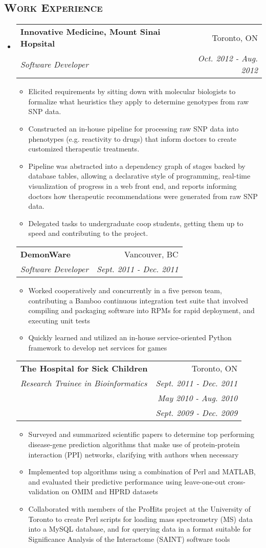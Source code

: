 \documentclass[letterpaper,11pt]{article}
\makeatletter
\newcommand{\company}[1]{
    \textbf{#1}
}
\newcommand{\heading}[1]{
    \textsc{\textbf{#1}}
}
\newcommand*\resheading[1]{\subsection*{\heading{#1}}\vspace{0.3em}\nopagebreak[4]}
\newcommand{\resitem}[1]{\item #1 \vspace{-2pt}}
\newcommand{\ressubheading}[4]{
\begin{tabular*}{6.5in}{l@{\extracolsep{\fill}}r}
    
		\company{#1} & #2 \\
		\textit{#3} & \textit{#4} \\
\end{tabular*}\vspace{-6pt}}
\newcommand{\sickkids}[6]{
\begin{tabular*}{6.5in}{l@{\extracolsep{\fill}}r}
		\company{#1} & #2 \\
		\textit{#3} & \textit{#4} \\
		 & \textit{#5} \\
		 & \textit{#6} \\
\end{tabular*}\vspace{-6pt}}
\makeatother
\begin{document}
\resheading{Work Experience}
\begin{itemize}
\item

	\ressubheading{Innovative Medicine, Mount Sinai Hopsital}{Toronto, ON}{Software Developer}{Oct. 2012 - Aug. 2012}
	\begin{itemize}
		\resitem{
            Elicited requirements by sitting down with molecular biologists to formalize 
            what heuristics they apply to determine genotypes from raw SNP data.
        }
		\resitem{
            Constructed an in-house pipeline for processing raw SNP data into phenotypes 
            (e.g. reactivity to drugs) that inform doctors to create customized therapeutic 
            treatments.  
        }
        \resitem{
            Pipeline was abstracted into a dependency graph of stages backed by database 
            tables, allowing a declarative style of programming,  real-time 
            visualization of progress in a web front end, and reports informing 
            doctors how therapeutic recommendations were generated from raw SNP data.
        }
        \resitem{
            Delegated tasks to undergraduate coop students, getting them up to speed and 
            contributing to the project.
        }
	\end{itemize}

	\ressubheading{DemonWare}{Vancouver, BC}{Software Developer}{Sept. 2011 - Dec. 2011}
	\begin{itemize}
		\resitem{
            Worked cooperatively and concurrently in a five person team, contributing a 
            Bamboo continuous integration test suite that involved compiling and packaging 
            software into RPMs for rapid deployment, and executing unit tests
        }
        \resitem{
            Quickly learned and utilized an in-house service-oriented Python framework to 
            develop net services for games
        }
	\end{itemize}

	\sickkids{The Hospital for Sick Children}{Toronto, ON}{Research Trainee in 
    Bioinformatics}{Sept. 2011 - Dec. 2011}{May 2010 - Aug. 2010}{Sept. 2009 - Dec. 2009}
	\begin{itemize}
		\resitem{
             Surveyed and summarized scientific papers to determine top performing 
             disease-gene prediction algorithms that make use of protein-protein interaction 
             (PPI) networks, clarifying with authors when necessary
        }
        \resitem{
             Implemented top algorithms using a combination of Perl and MATLAB, and 
             evaluated their predictive performance using leave-one-out cross-validation on 
             OMIM and HPRD datasets
        }
        \resitem{
             Collaborated with members of the ProHits project at the University of Toronto 
             to create Perl scripts for loading mass spectrometry (MS) data into a MySQL 
             database, and for querying data in a format suitable for Significance Analysis 
             of the Interactome (SAINT) software tools
        }
	\end{itemize}

\end{itemize}
\end{document}
